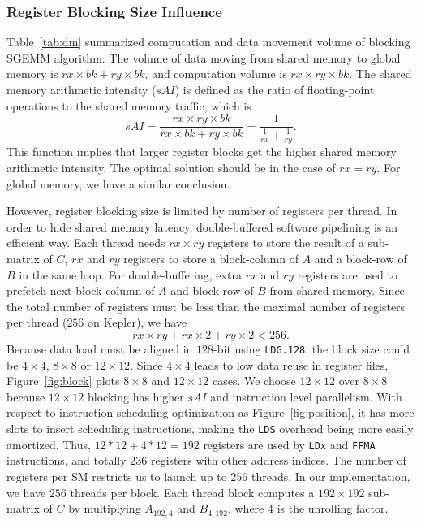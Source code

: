 \subsubsection{Register Blocking Size Influence}
Table~\ref{tab:dm} summarized computation and data movement volume of blocking SGEMM algorithm.
The volume of data moving from shared memory to global memory is $rx\times bk+ ry\times bk$, and computation volume is $rx\times ry\times bk$. 
The shared memory arithmetic intensity ($sAI$) is defined as the ratio of floating-point operations to the shared memory traffic, which is 
\begin{equation}
sAI = \frac {rx\times 
ry\times bk} {rx\times bk+ ry\times bk} = \frac{1}{\frac{1}{rx} + \frac{1}{ry}}.
\end{equation}
This function implies that larger register blocks get the higher shared memory arithmetic intensity.
The optimal solution should be in the case of $rx=ry$. 
For global memory, we have a similar conclusion.

However, register blocking size is limited by number of registers per thread. 
In order to hide shared memory latency, double-buffered software pipelining is an efficient way. 
Each thread needs $rx\times ry$ registers to store the result of a sub-matrix of $C$, $rx$ and $ry$ registers to store a block-column of $A$ and a block-row of $B$ in the same loop. 
For double-buffering, extra $rx$ and $ry$ registers are used to prefetch next block-column of $A$ and block-row of $B$ from shared memory. 
Since the total number of registers must be less than the maximal number of registers per thread ($256$ on Kepler), we have
\begin{equation}
    rx\times ry + rx\times 2 + ry\times 2 < 256.
\label{f_register}
\end{equation}
Because data load must be aligned in $128$-bit using 
{\tt LDG.128}, the block size could be $4\times 4$, $8\times 8$ or $12\times 12$. 
Since $4\times 4$ leads to low data reuse in register files, Figure~\ref{fig:block} plots $8\times8$ and $12\times12$ cases.
We choose $12\times12$ over $8\times8$ because
$12\times12$ blocking has higher $sAI$ and instruction level parallelism. 
With respect to 
instruction scheduling optimization as Figure~\ref{fig:position}, it has more slots to insert scheduling instructions, making the {\tt LDS} overhead being more easily amortized. 
Thus, $12*12+4*12=192$ registers are used by {\tt LDx} and {\tt FFMA} instructions, and totally $236$ registers with other address indices.
The number of registers per SM restricts us to launch up to $256$ threads. 
In our implementation, we have $256$ threads per block. 
Each thread block computes a $192\times 192$ sub-matrix of $C$ by multiplying $A_{192,4}$ and $B_{4, 192}$, where $4$ is the unrolling factor.

